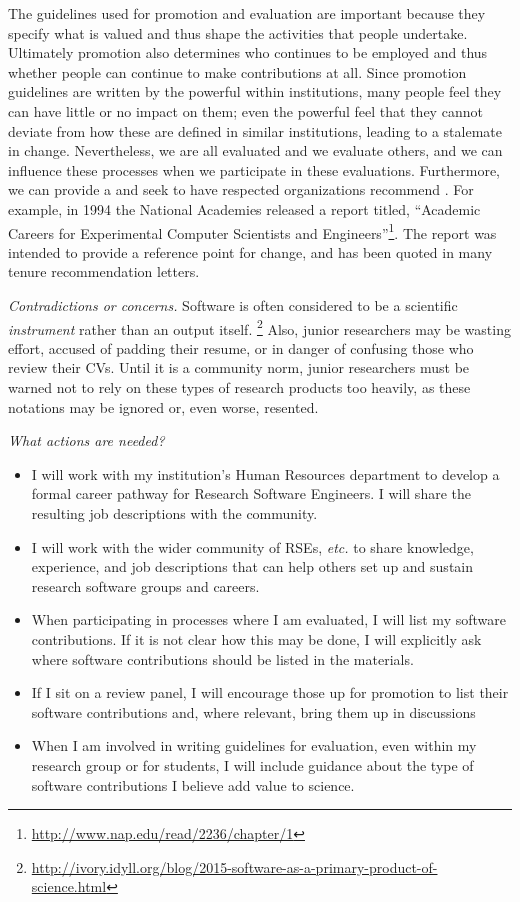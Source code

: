 \documentclass[a4paper,UKenglish]{dagman}
\newcommand{\etc}{\emph{etc.}\xspace}
\begin{document}
The guidelines used for promotion and evaluation are important because they specify what is valued and thus shape the activities that people undertake. Ultimately promotion also determines who continues to be employed and thus whether people can continue to make contributions at all. Since promotion guidelines are written by the powerful within institutions, many people feel they can have little or no impact on them; even the powerful feel that they cannot deviate from how these are defined in similar institutions, leading to a stalemate in change.
Nevertheless, we are all evaluated and we evaluate others, and we can influence these processes when we participate in these evaluations.
Furthermore, we can provide a    and seek to have respected organizations recommend . 
For example, in 1994 the National Academies released a report titled, ``Academic Careers for Experimental Computer Scientists and Engineers''\footnote{\url{http://www.nap.edu/read/2236/chapter/1}}. The report was intended to provide a reference point for change, and has been quoted in many tenure recommendation letters.


\emph{Contradictions or concerns.}
Software is often considered to be a scientific \emph{instrument} rather than an output itself.%
\footnote{\url{http://ivory.idyll.org/blog/2015-software-as-a-primary-product-of-science.html}}
Also, junior researchers may be wasting effort, accused of padding their resume, or in danger of confusing those who review their CVs. Until it is a community norm, junior researchers must be warned not to rely on these types of research products too heavily, as these notations may be ignored or, even worse, resented.


\emph{What actions are needed?}
\begin{itemize}
\item I will work with my institution's Human Resources department to develop a formal career pathway for Research Software Engineers. I will share the resulting job descriptions with the community.
\item I will work with the wider community of RSEs, \etc to share knowledge, experience, and job descriptions that can help others set up and sustain research software groups and careers.
\item When participating in processes where I am evaluated, I will list my software contributions.
If it is not clear how this may be done, I will explicitly ask where software contributions should be listed in the materials.
\item If I sit on a review panel, I will encourage those up for promotion to list their software contributions and, where relevant, bring them up in discussions
\item When I am involved in writing guidelines for evaluation, even within my research group or for students, I will include guidance about the type of software contributions I believe add value to science. 
\end{itemize}
\end{document}

